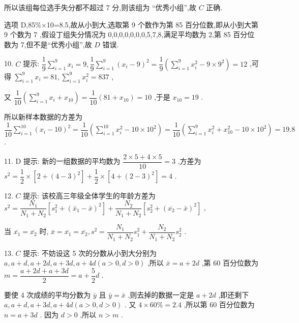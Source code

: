 所以该组每位选手失分都不超过 7 分,则该组为 “优秀小组”,故 $C$ 正确.

选项 D,85\%×10=8.5,故从小到大,选取第 9 个数作为第 85 百分位数,即从小到大第 9 个数为 7 ,假设丁组失分情况为 0,0,0,0,0,0,0,5,7,8,满足平均数为 2,第 85 百分位数为 7,但不是“优秀小组”,故 $D$ 错误.

10. $C$ 提示: $\dfrac{1}{9}\mathop{\sum }\limits_{{i = 1}}^{9}{x}_{i} = 9,\dfrac{1}{9}\mathop{\sum }\limits_{{i = 1}}^{9}{\left( {x}_{i} - 9\right) }^{2} = \dfrac{1}{9}\left( {\mathop{\sum }\limits_{{i = 1}}^{9}{x}_{i}^{2} - 9 \times  {9}^{2}}\right)  = {12}$ ,可得 $\mathop{\sum }\limits_{{i = 1}}^{9}{x}_{i} = {81},\mathop{\sum }\limits_{{i = 1}}^{9}{x}_{i}^{2} = {837}$ ,

又 $\dfrac{1}{10}\left( {\mathop{\sum }\limits_{{i = 1}}^{9}{x}_{i} + {x}_{10}}\right)  = \dfrac{1}{10}\left( {{81} + {x}_{10}}\right)  = {10}$ ,于是 ${x}_{10} = {19}$ .

所以新样本数据的方差为 $\dfrac{1}{10}\mathop{\sum }\limits_{{i = 1}}^{{10}}{\left( {x}_{i} - {10}\right) }^{2} = \dfrac{1}{10}\left( {\mathop{\sum }\limits_{{i = 1}}^{{10}}{x}_{i}^{2} - {10} \times  {10}^{2}}\right)  = \dfrac{1}{10}\left( {\mathop{\sum }\limits_{{i = 1}}^{9}{x}_{i}^{2} + {x}_{10}^{2} - {10} \times  {10}^{2}}\right)  = {19.8}$ .

11. D 提示: 新的一组数据的平均数为 $\dfrac{2 \times  5 + 4 \times  5}{10} = 3$ ,方差为 ${s}^{2} = \dfrac{1}{2} \times  \left\lbrack  {2 + {\left( 4 - 3\right) }^{2}}\right\rbrack   + \dfrac{1}{2} \times  \left\lbrack  {4 + {\left( 2 - 3\right) }^{2}}\right\rbrack   = 4$ .

12. $C$ 提示: 该校高三年级全体学生的年龄方差为 ${s}^{2} = \dfrac{{N}_{1}}{{N}_{1} + {N}_{2}}\left\lbrack  {{s}_{1}^{2} + {\left( {\bar{x}}_{1} - \bar{x}\right) }^{2}}\right\rbrack   + \dfrac{{N}_{2}}{{N}_{1} + {N}_{2}}\left\lbrack  {{s}_{2}^{2} + {\left( \overline{{x}_{2}} - \bar{x}\right) }^{2}}\right\rbrack$ ,

当 $\overline{{x}_{1}} = \overline{{x}_{2}}$ 时, $\overline{x} = \overline{{x}_{1}} = \overline{{x}_{2}},{s}^{2} = \dfrac{{N}_{1}}{{N}_{1} + {N}_{2}}{s}_{1}^{2} + \dfrac{{N}_{2}}{{N}_{1} + {N}_{2}}{s}_{2}^{2}$ .

13. $C$ 提示: 不妨设这 5 次的分数从小到大分别为 $a,a + d,a + {2d},a + {3d},a + {4d}\left( {a > 0,d > 0}\right)$ ,所以 $\bar{x} = a + {2d}$ ,第 60 百分位数为 $m = \dfrac{a + {2d} + a + {3d}}{2} = a + \dfrac{5}{2}d$ .

要使 4 次成绩的平均分数为 $\bar{y}$ 且 $\bar{y} = \bar{x}$ ,则去掉的数据一定是 $a + {2d}$ ,即还剩下 $a,a + d,a + {3d},a + {4d}\left( {a > 0,d > 0}\right)$ . 又 $4 \times  {60}\%  = {2.4}$ ,所以第 60 百分位数为 $n = a + {3d}$ . 因为 $d > 0$ ,所以 $n > m$ .

